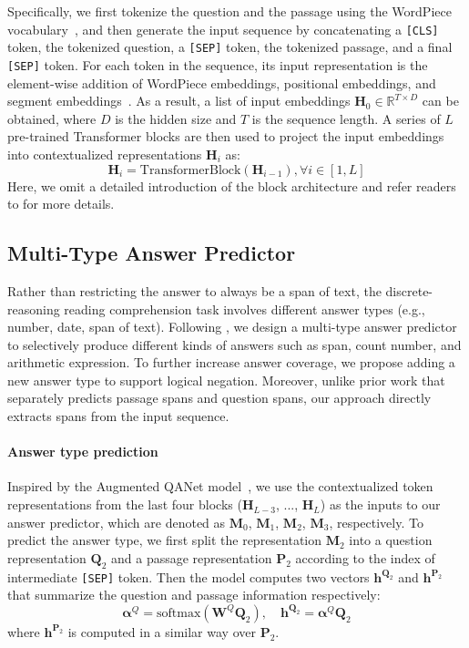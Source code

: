 \documentclass[11pt,a4paper]{article}
\begin{document}
Specifically, we first tokenize the question and the passage using the WordPiece vocabulary~\cite{wu2016google}, and then generate the input sequence by concatenating a \texttt{[CLS]} token, the tokenized question, a \texttt{[SEP]} token, the tokenized passage, and a final \texttt{[SEP]} token.
For each token in the sequence, its input representation is the element-wise addition of WordPiece embeddings, positional embeddings, and segment embeddings~\cite{devlin2018bert}. 
As a result, a list of input embeddings $\mathbf{H}_0 \in\mathbb{R}^{T \times D}$ can be obtained, where $D$ is the hidden size and $T$ is the sequence length. A series of $L$ pre-trained Transformer blocks are then used to project the input embeddings into contextualized representations $\mathbf{H}_i$ as:
\begin{equation}
	\mathbf{H}_i = \mathrm{TransformerBlock}(\mathbf{H}_{i-1}), \forall i \in [1,L] \nonumber
\end{equation}
Here, we omit a detailed introduction of the block architecture and refer readers to \citet{vaswani2017attention} for more details.


\subsection{Multi-Type Answer Predictor	\label{sec:ans-pred}}
Rather than restricting the answer to always be a span of text, the discrete-reasoning reading comprehension task involves different answer types (e.g., number, date, span of text).
Following \citet{dua2019drop}, we design a multi-type answer predictor to selectively produce different kinds of answers such as span, count number, and arithmetic expression.
To further increase answer coverage, we propose adding a new answer type to support logical negation.
Moreover, unlike prior work that separately predicts passage spans and question spans, our approach directly extracts spans from the input sequence.

\paragraph{Answer type prediction}
Inspired by the Augmented QANet model~\cite{dua2019drop}, we use the contextualized token representations from the last four blocks ($\mathbf{H}_{L-3}$, ..., $\mathbf{H}_L$) as the inputs to our answer predictor, which are denoted as $\mathbf{M}_0$, $\mathbf{M}_1$, $\mathbf{M}_2$, $\mathbf{M}_3$, respectively.
To predict the answer type, we first split the representation $\mathbf{M}_2$ into a question representation $\mathbf{Q}_2$ and a passage representation $\mathbf{P}_2$ according to the index of intermediate \texttt{[SEP]} token.
Then the model computes two vectors $\mathbf{h}^{\mathbf{Q}_2}$ and $\mathbf{h}^{\mathbf{P}_2}$ that summarize the question and passage information respectively:
\begin{equation}
	\boldsymbol{\alpha}^Q = \mathrm{softmax}(\mathbf{W}^Q \mathbf{Q}_2), \quad \mathbf{h}^{\mathbf{Q}_2} = \boldsymbol{\alpha}^Q \mathbf{Q}_2 \nonumber
\end{equation}
where $\mathbf{h}^{\mathbf{P}_2}$ is computed in a similar way over $\mathbf{P}_2$.
\end{document}
